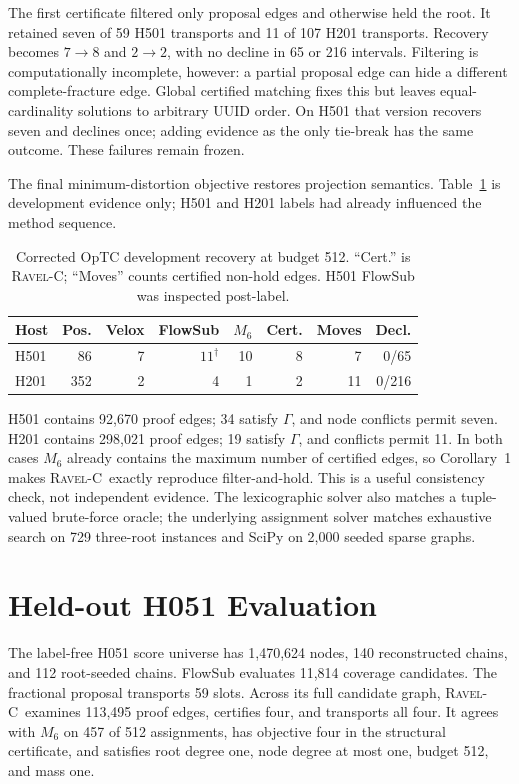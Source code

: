 \documentclass[runningheads]{llncs}
\newcommand{\ravelc}{\textsc{Ravel-C}}
\begin{document}
The first certificate filtered only proposal edges and otherwise held the root. It retained seven of 59 H501 transports and 11 of 107 H201 transports. Recovery becomes \(7\!\rightarrow\!8\) and \(2\!\rightarrow\!2\), with no decline in 65 or 216 intervals. Filtering is computationally incomplete, however: a partial proposal edge can hide a different complete-fracture edge. Global certified matching fixes this but leaves equal-cardinality solutions to arbitrary UUID order. On H501 that version recovers seven and declines once; adding evidence as the only tie-break has the same outcome. These failures remain frozen.

The final minimum-distortion objective restores projection semantics. Table~\ref{tab:certdev} is development evidence only; H501 and H201 labels had already influenced the method sequence.

\begin{table}[h]
\caption{Corrected OpTC development recovery at budget 512. ``Cert.'' is \ravelc; ``Moves'' counts certified non-hold edges. H501 FlowSub was inspected post-label.}
\label{tab:certdev}
\centering
\small
\setlength{\tabcolsep}{4pt}
\begin{tabular}{lrrrrrrr}
\toprule
Host & Pos. & Velox & FlowSub & \(M_6\) & Cert. & Moves & Decl.\\
\midrule
H501 & 86  & 7 & \(11^\dagger\) & 10 & 8 & 7  & 0/65\\
H201 & 352 & 2 & 4              & 1  & 2 & 11 & 0/216\\
\bottomrule
\end{tabular}
\end{table}

H501 contains 92,670 proof edges; 34 satisfy \(\Gamma\), and node conflicts permit seven. H201 contains 298,021 proof edges; 19 satisfy \(\Gamma\), and conflicts permit 11. In both cases \(M_6\) already contains the maximum number of certified edges, so Corollary~1 makes \ravelc\ exactly reproduce filter-and-hold. This is a useful consistency check, not independent evidence. The lexicographic solver also matches a tuple-valued brute-force oracle; the underlying assignment solver matches exhaustive search on 729 three-root instances and SciPy on 2,000 seeded sparse graphs.

\section{Held-out H051 Evaluation}

The label-free H051 score universe has 1,470,624 nodes, 140 reconstructed chains, and 112 root-seeded chains. FlowSub evaluates 11,814 coverage candidates. The fractional proposal transports 59 slots. Across its full candidate graph, \ravelc\ examines 113,495 proof edges, certifies four, and transports all four. It agrees with \(M_6\) on 457 of 512 assignments, has objective four in the structural certificate, and satisfies root degree one, node degree at most one, budget 512, and mass one.
\end{document}
